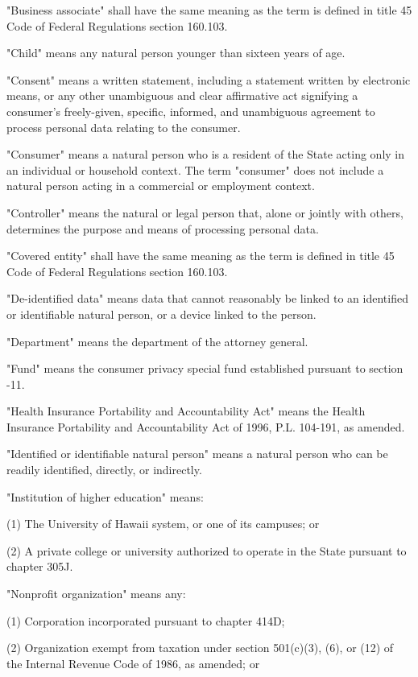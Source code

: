      "Business associate" shall have the same meaning as the term is defined in title 45 Code of Federal Regulations section 160.103.

     "Child" means any natural person younger than sixteen years of age.

     "Consent" means a written statement, including a statement written by electronic means, or any other unambiguous and clear affirmative act signifying a consumer's freely-given, specific, informed, and unambiguous agreement to process personal data relating to the consumer.

     "Consumer" means a natural person who is a resident of the State acting only in an individual or household context.  The term "consumer" does not include a natural person acting in a commercial or employment context.

     "Controller" means the natural or legal person that, alone or jointly with others, determines the purpose and means of processing personal data.

     "Covered entity" shall have the same meaning as the term is defined in title 45 Code of Federal Regulations section 160.103.

     "De-identified data" means data that cannot reasonably be linked to an identified or identifiable natural person, or a device linked to the person.

     "Department" means the department of the attorney general.

     "Fund" means the consumer privacy special fund established pursuant to section   -11.

     "Health Insurance Portability and Accountability Act" means the Health Insurance Portability and Accountability Act of 1996, P.L. 104-191, as amended.

     "Identified or identifiable natural person" means a natural person who can be readily identified, directly, or indirectly.

     "Institution of higher education" means:

     (1)  The University of Hawaii system, or one of its campuses; or

     (2)  A private college or university authorized to operate in the State pursuant to chapter 305J.

     "Nonprofit organization" means any:

     (1)  Corporation incorporated pursuant to chapter 414D;

     (2)  Organization exempt from taxation under section 501(c)(3), (6), or (12) of the Internal Revenue Code of 1986, as amended; or

